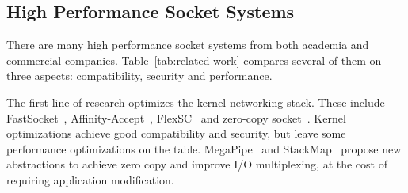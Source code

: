 





\subsection{High Performance Socket Systems}
\label{subsec:related-work}


There are many high performance socket systems from both academia and commercial companies.
Table~\ref{tab:related-work} compares several of them on three aspects: compatibility, security and performance.  

The first line of research optimizes the kernel networking stack. These include FastSocket~\cite{lin2016scalable}, Affinity-Accept~\cite{pesterev2012improving}, FlexSC~\cite{soares2010flexsc} and zero-copy socket~\cite{thadani1995efficient,chu1996zero,linux-zero-copy}.
Kernel optimizations achieve good compatibility and security, but leave some performance optimizations on the table.
MegaPipe~\cite{han2012megapipe} and StackMap~\cite{yasukata2016stackmap} propose new abstractions to achieve zero copy and improve I/O multiplexing, at the cost of requiring application modification.

